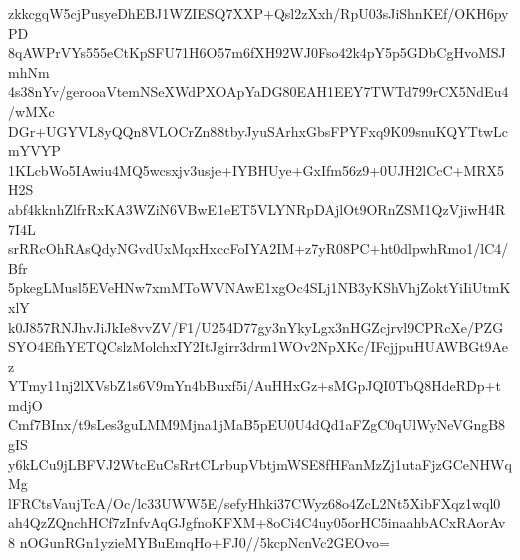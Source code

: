 zkkcgqW5cjPusyeDhEBJ1WZIESQ7XXP+Qsl2zXxh/RpU03sJiShnKEf/OKH6pyPD
8qAWPrVYs555eCtKpSFU71H6O57m6fXH92WJ0Fso42k4pY5p5GDbCgHvoMSJmhNm
4s38nYv/gerooaVtemNSeXWdPXOApYaDG80EAH1EEY7TWTd799rCX5NdEu4/wMXc
DGr+UGYVL8yQQn8VLOCrZn88tbyJyuSArhxGbsFPYFxq9K09snuKQYTtwLcmYVYP
1KLcbWo5IAwiu4MQ5wcsxjv3usje+IYBHUye+GxIfm56z9+0UJH2lCcC+MRX5H2S
abf4kknhZlfrRxKA3WZiN6VBwE1eET5VLYNRpDAjlOt9ORnZSM1QzVjiwH4R7I4L
srRRcOhRAsQdyNGvdUxMqxHxccFoIYA2IM+z7yR08PC+ht0dlpwhRmo1/lC4/Bfr
5pkegLMusl5EVeHNw7xmMToWVNAwE1xgOc4SLj1NB3yKShVhjZoktYiIiUtmKxlY
k0J857RNJhvJiJkIe8vvZV/F1/U254D77gy3nYkyLgx3nHGZcjrvl9CPRcXe/PZG
SYO4EfhYETQCslzMolchxIY2ItJgirr3drm1WOv2NpXKc/IFcjjpuHUAWBGt9Aez
YTmy11nj2lXVsbZ1s6V9mYn4bBuxf5i/AuHHxGz+sMGpJQI0TbQ8HdeRDp+tmdjO
Cmf7BInx/t9sLes3guLMM9Mjna1jMaB5pEU0U4dQd1aFZgC0qUlWyNeVGngB8gIS
y6kLCu9jLBFVJ2WtcEuCsRrtCLrbupVbtjmWSE8fHFanMzZj1utaFjzGCeNHWqMg
lFRCtsVaujTcA/Oc/lc33UWW5E/sefyHhki37CWyz68o4ZcL2Nt5XibFXqz1wql0
ah4QzZQnchHCf7zInfvAqGJgfnoKFXM+8oCi4C4uy05orHC5inaahbACxRAorAv8
nOGunRGn1yzieMYBuEmqHo+FJ0//5kcpNcnVc2GEOvo=
